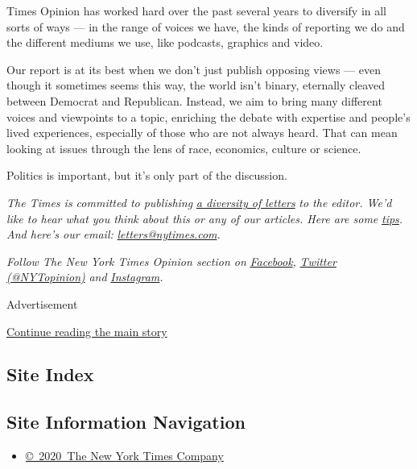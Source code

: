Times Opinion has worked hard over the past several years to diversify
in all sorts of ways --- in the range of voices we have, the kinds of
reporting we do and the different mediums we use, like podcasts,
graphics and video.

Our report is at its best when we don't just publish opposing views ---
even though it sometimes seems this way, the world isn't binary,
eternally cleaved between Democrat and Republican. Instead, we aim to
bring many different voices and viewpoints to a topic, enriching the
debate with expertise and people's lived experiences, especially of
those who are not always heard. That can mean looking at issues through
the lens of race, economics, culture or science.

Politics is important, but it's only part of the discussion.

\emph{The Times is committed to publishing}
\href{https://www.nytimes.com/2019/01/31/opinion/letters/letters-to-editor-new-york-times-women.html}{\emph{a
diversity of letters}} \emph{to the editor. We'd like to hear what you
think about this or any of our articles. Here are some}
\href{https://help.nytimes.com/hc/en-us/articles/115014925288-How-to-submit-a-letter-to-the-editor}{\emph{tips}}\emph{.
And here's our email:}
\href{mailto:letters@nytimes.com}{\emph{letters@nytimes.com}}\emph{.}

\emph{Follow The New York Times Opinion section on}
\href{https://www.facebook.com/nytopinion}{\emph{Facebook}}\emph{,}
\href{http://twitter.com/NYTOpinion}{\emph{Twitter (@NYTopinion)}}
\emph{and}
\href{https://www.instagram.com/nytopinion/}{\emph{Instagram}}\emph{.}

Advertisement

\protect\hyperlink{after-bottom}{Continue reading the main story}

\hypertarget{site-index}{%
\subsection{Site Index}\label{site-index}}

\hypertarget{site-information-navigation}{%
\subsection{Site Information
Navigation}\label{site-information-navigation}}

\begin{itemize}
\tightlist
\item
  \href{https://help.nytimes.com/hc/en-us/articles/115014792127-Copyright-notice}{©~2020~The
  New York Times Company}
\end{itemize}

